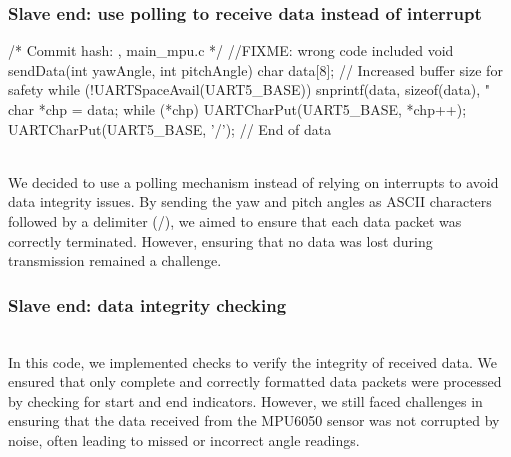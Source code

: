 \documentclass[12pt, a4paper]{article}
\begin{document}
\subsubsection{Slave end: use polling to receive data instead of interrupt}\text{}
\begin{code}
/* Commit hash: , main_mpu.c */ //FIXME: wrong code included
void sendData(int yawAngle, int pitchAngle) {
    char data[8]; // Increased buffer size for safety
    while (!UARTSpaceAvail(UART5_BASE)) {}
    snprintf(data, sizeof(data), "%
    char *chp = data;
    while (*chp) {
        UARTCharPut(UART5_BASE, *chp++);
    }
    UARTCharPut(UART5_BASE, '/'); // End of data
}
\end{code}\text{}\\
We decided to use a polling mechanism instead of relying on interrupts to avoid data integrity issues. 
By sending the yaw and pitch angles as ASCII characters followed by a delimiter (/), 
we aimed to ensure that each data packet was correctly terminated. 
However, ensuring that no data was lost during transmission remained a challenge.

\subsubsection{Slave end: data integrity checking}\text{}
\text{}\\
In this code, we implemented checks to verify the integrity of received data. 
We ensured that only complete and correctly formatted data packets were processed by checking for start and end indicators. 
However, we still faced challenges in ensuring that the data received from the MPU6050 sensor was not corrupted by noise, 
often leading to missed or incorrect angle readings.
\end{document}
